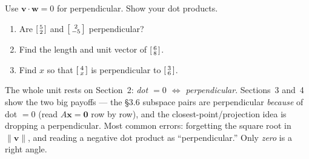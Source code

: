 \documentclass[10pt]{article}
\newcommand{\vv}{\mathbf{v}}
\newcommand{\ww}{\mathbf{w}}
\newcommand{\xx}{\mathbf{x}}
\newcommand{\zero}{\mathbf{0}}
\begin{document}
\begin{practicebox}
Use $\vv\cdot\ww=0$ for perpendicular. Show your dot products.
\begin{enumerate}[leftmargin=1.6em, itemsep=4pt]
  \item Are $\begin{bsmallmatrix} 5\\2 \end{bsmallmatrix}$ and $\begin{bsmallmatrix} 2\\-5 \end{bsmallmatrix}$ perpendicular? 
  \item Find the length and unit vector of $\begin{bsmallmatrix} 6\\8 \end{bsmallmatrix}$. 
  \item Find $x$ so that $\begin{bsmallmatrix} 4\\x \end{bsmallmatrix}$ is perpendicular to $\begin{bsmallmatrix} 3\\6 \end{bsmallmatrix}$. 
\end{enumerate}
\end{practicebox}

\begin{teachernote}
The whole unit rests on Section~2: \emph{dot $=0$ $\Leftrightarrow$ perpendicular}. Sections~3 and~4
show the two big payoffs --- the §3.6 subspace pairs are perpendicular \emph{because} of dot $=0$
(read $A\xx=\zero$ row by row), and the closest-point/projection idea is dropping a perpendicular.
Most common errors: forgetting the square root in $\|\vv\|$, and reading a negative dot product as
``perpendicular.'' Only \emph{zero} is a right angle.
\end{teachernote}
\end{document}
